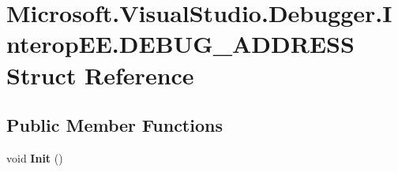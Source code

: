 \hypertarget{struct_microsoft_1_1_visual_studio_1_1_debugger_1_1_interop_e_e_1_1_d_e_b_u_g___a_d_d_r_e_s_s}{\section{Microsoft.\+Visual\+Studio.\+Debugger.\+Interop\+E\+E.\+D\+E\+B\+U\+G\+\_\+\+A\+D\+D\+R\+E\+S\+S Struct Reference}
\label{struct_microsoft_1_1_visual_studio_1_1_debugger_1_1_interop_e_e_1_1_d_e_b_u_g___a_d_d_r_e_s_s}
}
\subsection*{Public Member Functions}
\begin{DoxyCompactItemize}
\item 
\hypertarget{struct_microsoft_1_1_visual_studio_1_1_debugger_1_1_interop_e_e_1_1_d_e_b_u_g___a_d_d_r_e_s_s_adee0c6e3aa4959b90f804fc1b8f09225}{void {\bfseries Init} ()}\label{struct_microsoft_1_1_visual_studio_1_1_debugger_1_1_interop_e_e_1_1_d_e_b_u_g___a_d_d_r_e_s_s_adee0c6e3aa4959b90f804fc1b8f09225}

\end{DoxyCompactItemize}
